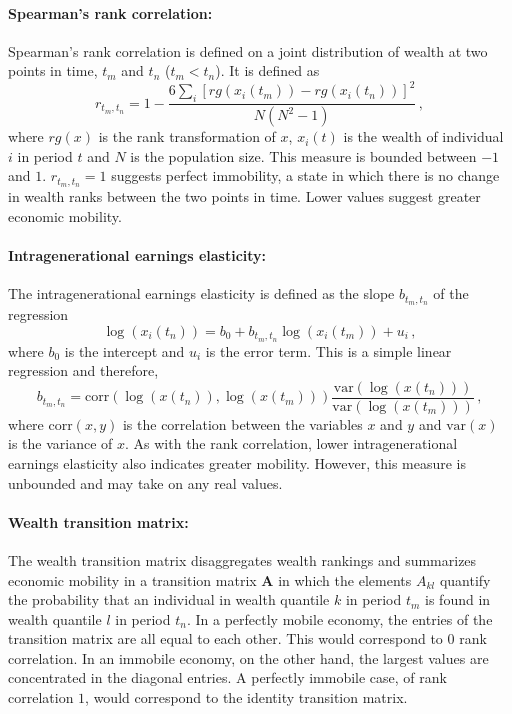 \documentclass[11pt]{article}
\newcommand{\be}{\begin{equation}}
\newcommand{\ee}{\end{equation}}
\numberwithin{equation}{section}
\begin{document}
\paragraph{Spearman's rank correlation:} Spearman's rank correlation is defined on a joint distribution of wealth at two points in time, $t_m$ and $t_n$ ($t_m < t_n$). It is defined as
%
\be
    r_{t_m,t_n} = 1 - \frac{6\sum_i \left[rg\left(x_i\left(t_m\right)\right) - rg\left(x_i\left(t_n\right)\right)\right]^2}{N\left(N^2-1\right)}\,,
\ee
%
where $rg(x)$ is the rank transformation of $x$, $x_i(t)$ is the wealth of individual $i$ in period $t$ and $N$ is the population size. This measure is bounded between $-1$ and $1$. $r_{t_m,t_n} = 1$ suggests perfect immobility, a state in which there is no change in wealth ranks between the two points in time. Lower values suggest greater economic mobility.

\paragraph{Intragenerational earnings elasticity:} The intragenerational earnings elasticity is defined as the slope $b_{t_m,t_n}$ of the regression
%
\be
   \log\left(x_i\left(t_n\right)\right) = b_0 + b_{t_m,t_n} \log\left(x_i\left(t_m\right)\right) + u_i\,,
\ee
%
where $b_0$ is the intercept and $u_i$ is the error term. This is a simple linear regression and therefore,
%
\be
    b_{t_m,t_n} = \mathrm{corr}\left(\log\left(x\left(t_n\right)\right),\log\left(x\left(t_m\right)\right)\right) \frac{\mathrm{var}\left(\log\left(x\left(t_n\right)\right)\right)}{\mathrm{var}\left(\log\left(x\left(t_m\right)\right)\right)}\,,
    \label{eq:iee-estimation}
\ee
%
where $\mathrm{corr}(x,y)$ is the correlation between the variables $x$ and $y$ and $\mathrm{var}(x)$ is the variance of $x$. As with the rank correlation, lower intragenerational earnings elasticity also indicates greater mobility. However, this measure is unbounded and may take on any real values.

\paragraph{Wealth transition matrix:} The wealth transition matrix disaggregates wealth rankings and summarizes economic mobility in a
transition matrix $\mathbf{A}$ in which the elements $A_{kl}$ quantify the probability that an individual in wealth quantile $k$ in period $t_m$ is found in wealth quantile $l$ in period $t_n$. In a perfectly mobile economy, the entries of the transition matrix are all equal to each other. This would correspond to $0$ rank correlation. In an immobile economy, on the other hand, the largest values are concentrated in the diagonal entries. A perfectly immobile case, of rank correlation $1$, would correspond to the identity transition matrix.
\end{document}
